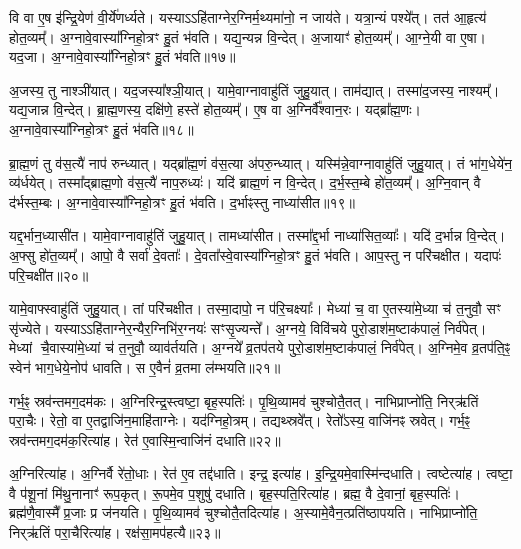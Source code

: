 वि वा ए॒ष इ॑न्द्रि॒येण॑ वी॒र्ये॑णर्ध्यते।
यस्याऽऽहि॑ताग्ने\-र॒ग्निर्म॒थ्य\-मा॑नो॒ न जाय॑ते।
यत्रा॒न्यं पश्ये᳚त्।
तत॑ आ॒हृत्य॑ होत॒व्यम्᳚।
अ॒ग्नावे॒वास्या᳚ग्निहो॒त्रꣳ हु॒तं भ॑वति।
यद्य॒न्यन्न वि॒न्देत्।
अ॒जायाꣳ॑ होत॒व्यम्᳚।
आ॒ग्ने॒यी वा ए॒षा।
यद॒जा।
अ॒ग्नावे॒वास्या᳚ग्निहो॒त्रꣳ हु॒तं भ॑वति॥१७॥

अ॒जस्य॒ तु नाश्ञी॑यात्।
यद॒जस्या᳚श्ञी॒यात्।
यामे॒वाग्नावाहु॑तिं जुहु॒यात्।
ताम॑द्यात्।
तस्मा॑द॒जस्य॒ नाश्यम्᳚।
यद्य॒जान्न वि॒न्देत्।
ब्रा॒ह्म॒णस्य॒ दक्षि॑णे॒ हस्ते॑ होत॒व्यम्᳚।
ए॒ष वा अ॒ग्निर्वै᳚श्वान॒रः।
यद्ब्रा᳚ह्म॒णः।
अ॒ग्नावे॒वास्या᳚ग्निहो॒त्रꣳ हु॒तं भ॑वति॥१८॥

ब्रा॒ह्म॒णं तु व॑स॒त्यै॑ नाप॑ रुन्ध्यात्।
यद्ब्रा᳚ह्म॒णं व॑स॒त्या अ॑परु॒न्ध्यात्।
यस्मि॑न्ने॒वाग्नावाहु॑तिं जुहु॒यात्।
तं भा॑ग॒धेये॑न॒ व्य॑र्धयेत्।
तस्मा᳚द्ब्राह्म॒णो व॑स॒त्यै॑ नाप॒रुध्यः॑।
यदि॑ ब्राह्म॒णं न वि॒न्देत्।
द॒र्भ॒स्त॒म्बे हो॑त॒व्यम्᳚।
अ॒ग्नि॒वान् वै द॑र्भस्त॒म्बः।
अ॒ग्नावे॒वास्या᳚ग्निहो॒त्रꣳ हु॒तं भ॑वति।
द॒र्भाꣴस्तु नाध्या॑सीत॥१९॥

यद्द॒र्भान॒ध्यासी॑त।
यामे॒वाग्नावाहु॑तिं जुहु॒यात्।
तामध्या॑सीत।
तस्मा᳚द्द॒र्भा नाध्या॑सित॒व्याः᳚।
यदि॑ द॒र्भान्न वि॒न्देत्।
अ॒फ्सु हो॑त॒व्यम्᳚।
आपो॒ वै सर्वा॑ दे॒वताः᳚।
दे॒वता᳚स्वे॒वास्या᳚ग्निहो॒त्रꣳ हु॒तं भ॑वति।
आप॒स्तु न परि॑चक्षीत।
यदापः॑ परि॒चक्षी॑त॥२०॥

यामे॒वाफ्स्वाहु॑तिं जुहु॒यात्।
तां परि॑चक्षीत।
तस्मा॒दापो॒ न प॑रि॒चक्ष्याः᳚।
मेध्या॑ च॒ वा ए॒तस्या॑मे॒ध्या च॑ त॒नुवौ॒ सꣳ सृ॑ज्येते।
यस्याऽऽहि॑ताग्नेर॒न्यैर॒ग्निभि॑र॒ग्नयः॑ सꣳसृ॒ज्यन्ते᳚।
अ॒ग्नये॒ विवि॑चये पुरो॒डाश॑म॒ष्टा\-क॑पालं॒ निर्व॑पेत्।
मेध्यां चै॒वास्या॑मे॒ध्यां च॑ त॒नुवौ॒ व्याव॑र्तयति।
अ॒ग्नये᳚ व्र॒तप॑तये पुरो॒डाश॑म॒ष्टा\-क॑पालं॒ निर्व॑पेत्।
अ॒ग्निमे॒व व्र॒तप॑ति॒ꣴ॒ स्वेन॑ भाग॒धेये॒नोप॑ धावति।
स ए॒वैनं॑ व्र॒तमा ल॑म्भयति॥२१॥

गर्भ॒ꣴ॒ स्रव॑न्तमग॒दम॑कः।
अ॒ग्निरिन्द्र॒स्त्वष्टा॒ बृह॒स्पतिः॑।
पृ॒थि॒व्यामव॑ चुश्चोतै॒तत्।
नाभिप्राप्नो॑ति॒ निर्‌\mbox{}ऋ॑तिं परा॒चैः।
रेतो॒ वा ए॒तद्वाजि॑न॒माहि॑ताग्नेः।
यद॑ग्निहो॒त्रम्।
तद्यथ्स्रवे᳚त्।
रेतो᳚\-ऽस्य॒ वाजि॑नꣴ स्रवेत्।
गर्भ॒ꣴ॒ स्रव॑न्तमग॒दम॑क॒रित्या॑ह।
रेत॑ ए॒वास्मि॒न्वाजि॑नं दधाति॥२२॥

अ॒ग्निरित्या॑ह।
अ॒ग्निर्वै रे॑तो॒धाः।
रेत॑ ए॒व तद्द॑धाति।
इन्द्र॒ इत्या॑ह।
इ॒न्द्रि॒यमे॒वास्मि॑न्दधाति।
त्वष्टेत्या॑ह।
त्वष्टा॒ वै प॑शू॒नां मि॑थु॒नानाꣳ॑ रूप॒कृत्।
रू॒पमे॒व प॒शुषु॑ दधाति।
बृह॒स्पति॒रित्या॑ह।
ब्रह्म॒ वै दे॒वानां॒ बृह॒स्पतिः॑।
ब्रह्म॑णै॒वास्मै᳚ प्र॒जाः प्र ज॑नयति।
पृ॒थि॒व्यामव॑ चुश्चोतै॒तदित्या॑ह।
अ॒स्यामे॒वैन॒त्प्रति॑\-ष्ठापयति।
नाभिप्राप्नो॑ति॒ निर्‌\mbox{}ऋ॑तिं परा॒चैरित्या॑ह।
रक्ष॑सा॒मप॑हत्यै॥२३॥

